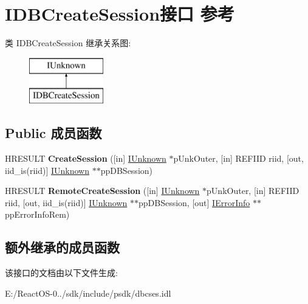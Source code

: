 \hypertarget{interface_i_d_b_create_session}{}\section{I\+D\+B\+Create\+Session接口 参考}
\label{interface_i_d_b_create_session}
类 I\+D\+B\+Create\+Session 继承关系图\+:\begin{figure}[H]
\begin{center}
\leavevmode
\includegraphics[height=2.000000cm]{interface_i_d_b_create_session}
\end{center}
\end{figure}
\subsection*{Public 成员函数}
\begin{DoxyCompactItemize}
\item 
\mbox{\label{interface_i_d_b_create_session_aba545e6688b1edde7bb5afaa4b4c3000}} 
H\+R\+E\+S\+U\+LT {\bfseries Create\+Session} (\mbox{[}in\mbox{]} \hyperlink{interface_i_unknown}{I\+Unknown} $\ast$p\+Unk\+Outer, \mbox{[}in\mbox{]} R\+E\+F\+I\+ID riid, \mbox{[}out, iid\+\_\+is(riid)\mbox{]} \hyperlink{interface_i_unknown}{I\+Unknown} $\ast$$\ast$pp\+D\+B\+Session)
\item 
\mbox{\label{interface_i_d_b_create_session_ae6a627323c73f0e214339bef6f19eacf}} 
H\+R\+E\+S\+U\+LT {\bfseries Remote\+Create\+Session} (\mbox{[}in\mbox{]} \hyperlink{interface_i_unknown}{I\+Unknown} $\ast$p\+Unk\+Outer, \mbox{[}in\mbox{]} R\+E\+F\+I\+ID riid, \mbox{[}out, iid\+\_\+is(riid)\mbox{]} \hyperlink{interface_i_unknown}{I\+Unknown} $\ast$$\ast$pp\+D\+B\+Session, \mbox{[}out\mbox{]} \hyperlink{interface_i_error_info}{I\+Error\+Info} $\ast$$\ast$pp\+Error\+Info\+Rem)
\end{DoxyCompactItemize}
\subsection*{额外继承的成员函数}


该接口的文档由以下文件生成\+:\begin{DoxyCompactItemize}
\item 
E\+:/\+React\+O\+S-\/0../sdk/include/psdk/dbcses.\+idl\end{DoxyCompactItemize}
